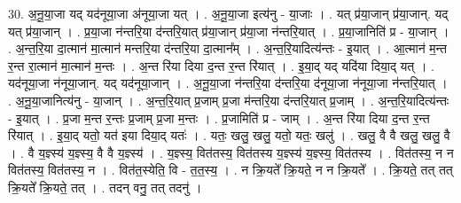 \documentclass[17pt]{extarticle}
\begin{document}
30. अ॒नू॒या॒जा यद् यद॑नूया॒जा अ॑नूया॒जा यत् । . अ॒नू॒या॒जा इत्य॑नु - या॒जाः । . यत् प्र॑या॒जान् प्र॑या॒जान्. यद् यत् प्र॑या॒जान् । . प्र॒या॒जा न॑न्तरि॒या द॑न्तरि॒यात् प्र॑या॒जान् प्र॑या॒जा न॑न्तरि॒यात् । . प्र॒या॒जानिति॑ प्र - या॒जान् । . अ॒न्त॒रि॒या दा॒त्मान॑ मा॒त्मान॑ मन्तरि॒या द॑न्तरि॒या दा॒त्मान᳚म् । . अ॒न्त॒रि॒यादित्य॑न्तः - इ॒यात् । . आ॒त्मान॑ म॒न्त र॒न्त रा॒त्मान॑ मा॒त्मान॑ म॒न्तः । . अ॒न्त रि॑या दिया द॒न्त र॒न्त रि॑यात् । . इ॒या॒द् यद् यदि॑या दिया॒द् यत् । . यद॑नूया॒जा न॑नूया॒जान्. यद् यद॑नूया॒जान् । . अ॒नू॒या॒जा न॑न्तरि॒या द॑न्तरि॒या द॑नूया॒जा न॑नूया॒जा न॑न्तरि॒यात् । . अ॒नू॒या॒जानित्य॑नु - या॒जान् । . अ॒न्त॒रि॒यात् प्र॒जाम् प्र॒जा म॑न्तरि॒या द॑न्तरि॒यात् प्र॒जाम् । . अ॒न्त॒रि॒यादित्य॑न्तः - इ॒यात् । . प्र॒जा म॒न्त र॒न्तः प्र॒जाम् प्र॒जा म॒न्तः । . प्र॒जामिति॑ प्र - जाम् । . अ॒न्त रि॑या दिया द॒न्त र॒न्त रि॑यात् । . इ॒या॒द् यतो॒ यत॑ इया दिया॒द् यतः॑ । . यतः॒ खलु॒ खलु॒ यतो॒ यतः॒ खलु॑ । . खलु॒ वै वै खलु॒ खलु॒ वै । . वै य॒ज्ञ्स्य॑ य॒ज्ञ्स्य॒ वै वै य॒ज्ञ्स्य॑ । . य॒ज्ञ्स्य॒ वित॑तस्य॒ वित॑तस्य य॒ज्ञ्स्य॑ य॒ज्ञ्स्य॒ वित॑तस्य । . वित॑तस्य॒ न न वित॑तस्य॒ वित॑तस्य॒ न । . वित॑त॒स्येति॒ वि - त॒त॒स्य॒ । . न क्रि॒यते᳚ क्रि॒यते॒ न न क्रि॒यते᳚ । . क्रि॒यते॒ तत् तत् क्रि॒यते᳚ क्रि॒यते॒ तत् । . तदन् वनु॒ तत् तदनु॑ । \newline
\end{document}
